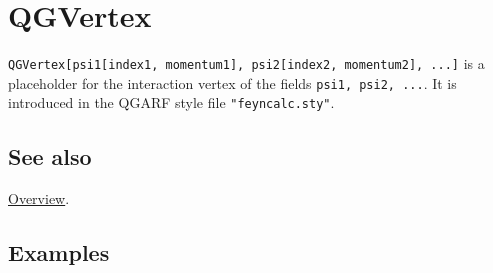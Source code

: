 \documentclass[../FeynHelpersManual.tex]{subfiles}
\begin{document}
\hypertarget{qgvertex}{
\section{QGVertex}\label{qgvertex}}

\texttt{QGVertex[\allowbreak{}psi1[\allowbreak{}index1,\ \allowbreak{}momentum1],\ \allowbreak{}psi2[\allowbreak{}index2,\ \allowbreak{}momentum2],\ \allowbreak{}...]}
is a placeholder for the interaction vertex of the fields
\texttt{psi1,\ \allowbreak{}psi2,\ \allowbreak{}...}. It is introduced
in the QGARF style file \texttt{"feyncalc.sty"}.

\subsection{See also}

\hyperlink{toc}{Overview}.

\subsection{Examples}
\end{document}
